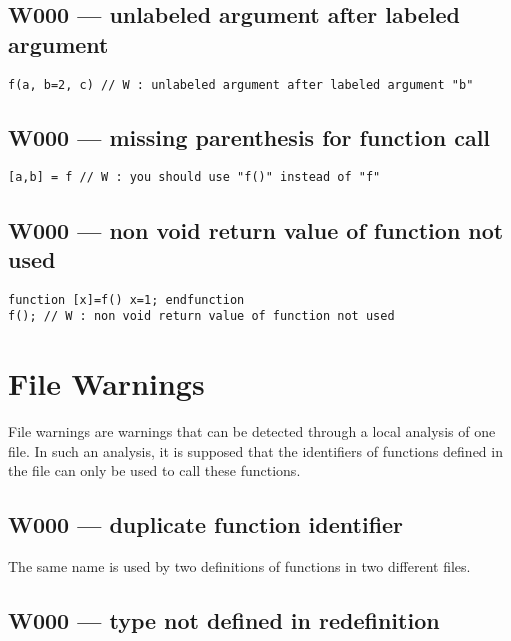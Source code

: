 \subsection{W000 --- unlabeled argument after labeled argument}


\begin{verbatim}
f(a, b=2, c) // W : unlabeled argument after labeled argument "b"
\end{verbatim}


\subsection{W000 --- missing parenthesis for function call}


\begin{verbatim}
[a,b] = f // W : you should use "f()" instead of "f"
\end{verbatim}


\subsection{W000 --- non void return value of function not used}


\begin{verbatim}
function [x]=f() x=1; endfunction
f(); // W : non void return value of function not used

\end{verbatim}


\section{File Warnings}

File warnings are warnings that can be detected through a local
analysis of one file. In such an analysis, it is supposed that the
identifiers of functions defined in the file can only be used to call
these functions.

\subsection{W000 --- duplicate function identifier}




The same name is used by two definitions of functions in
two different files.



\subsection{W000 --- type not defined in redefinition}


